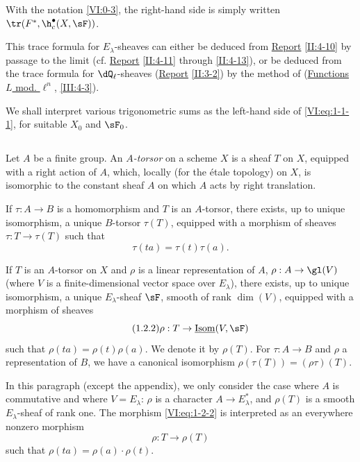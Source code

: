 With the notation \ref{VI:0-3}, the right-hand side is simply written 
$\tr(F^\ast,\h_c^\bullet(X,\sF))$. 

This trace formula for $E_\lambda$-sheaves can either be 
deduced from \hyperref[II]{Report} \ref{II:4-10} by passage to the limit (cf. 
\hyperref[II]{Report} \ref{II:4-11} through \ref{II:4-13}), or be deduced 
from the trace formula for $\dQ_\ell$-sheaves (\hyperref[II]{Report} 
\ref{II:3-2}) by the method of (\hyperref[III]{Functions $L$ mod. $\ell^n$}, 
\ref{III:4-3}). 

We shall interpret various trigonometric sums as the left-hand side of 
\eqref{VI:eq:1-1-1}, for suitable $X_0$ and $\sF_0$. 





\subsection{}\label{VI:1-2}

Let $A$ be a finite group. An \emph{$A$-torsor} on a scheme $X$ is a 
sheaf $T$ on $X$, equipped with a right action of $A$, which, locally 
(for the étale topology) on $X$, is isomorphic to the constant sheaf $A$ on 
which $A$ acts by right translation. 

If $\tau:A\to B$ is a homomorphism and $T$ is an $A$-torsor, there exists, 
up to unique isomorphism, a unique $B$-torsor $\tau(T)$, equipped with a 
morphism of sheaves $\tau:T\to \tau(T)$ such that 
\begin{equation*}\tag{1.2.1}\label{VI:eq:1-2-1}
  \tau(t a) = \tau(t) \tau(a)\text{.}
\end{equation*}

If $T$ is an $A$-torsor on $X$ and $\rho$ is a linear representation 
of $A$, $\rho:A\to \gl(V)$ (where $V$ is a finite-dimensional vector space over 
$E_\lambda$), there exists, up to unique isomorphism, a unique 
$E_\lambda$-sheaf $\sF$, smooth of rank $\dim(V)$, equipped with a morphism of 
sheaves 
\begin{equation*}\tag{1.2.2}\label{VI:eq:1-2-2}
  \rho:T\to \underline{\operatorname{Isom}}(V,\sF)
\end{equation*}
such that $\rho(t a) = \rho(t) \rho(a)$. We denote it by $\rho(T)$. For 
$\tau:A\to B$ and $\rho$ a representation of $B$, we have a canonical 
isomorphism $\rho(\tau(T)) = (\rho\tau)(T)$. 

In this paragraph (except the appendix), we only consider the case where $A$ 
is commutative and where $V=E_\lambda$: $\rho$ is a character 
$A\to E_\lambda^\ast$, and $\rho(T)$ is a smooth $E_\lambda$-sheaf of rank 
one. The morphism \eqref{VI:eq:1-2-2} is interpreted as an everywhere 
nonzero morphism 
\begin{equation*}\tag{1.2.3}\label{VI:eq:1-2-3}
  \rho:T\to \rho(T) 
\end{equation*}
such that $\rho(t a) = \rho(a)\cdot\rho(t)$. 





